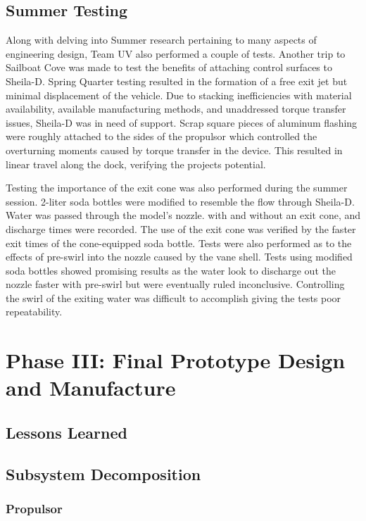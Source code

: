 \documentclass{report}
\begin{document}
\section{Summer Testing}
Along with delving into Summer research pertaining to many aspects of engineering design, Team UV also performed a couple of tests.  Another trip to Sailboat Cove was made to test the benefits of attaching control surfaces to Sheila-D.  Spring Quarter testing resulted in the formation of a free exit jet but minimal displacement of the vehicle.  Due to stacking inefficiencies with material availability, available manufacturing methods, and unaddressed torque transfer issues, Sheila-D was in need of support.  Scrap square pieces of aluminum flashing were roughly attached to the sides of the propulsor which controlled the overturning moments caused by torque transfer in the device.  This resulted in linear travel along the dock, verifying the projects potential.\par
Testing the importance of the exit cone was also performed during the summer session.  2-liter soda bottles were modified to resemble the flow through Sheila-D.  Water was passed through the model’s nozzle. with and without an exit cone, and discharge times were recorded.  The use of the exit cone was verified by the faster exit times of the cone-equipped soda bottle.  Tests were also performed as to the effects of pre-swirl into the nozzle caused by the vane shell.  Tests using modified soda bottles showed promising results as the water look to discharge out the nozzle faster with pre-swirl but were eventually ruled inconclusive.  Controlling the swirl of the exiting water was difficult to accomplish giving the tests poor repeatability.\\
\chapter{Phase III: Final Prototype Design and Manufacture}
\section{Lessons Learned}
\section{Subsystem Decomposition}
\subsection{Propulsor}
\end{document}
